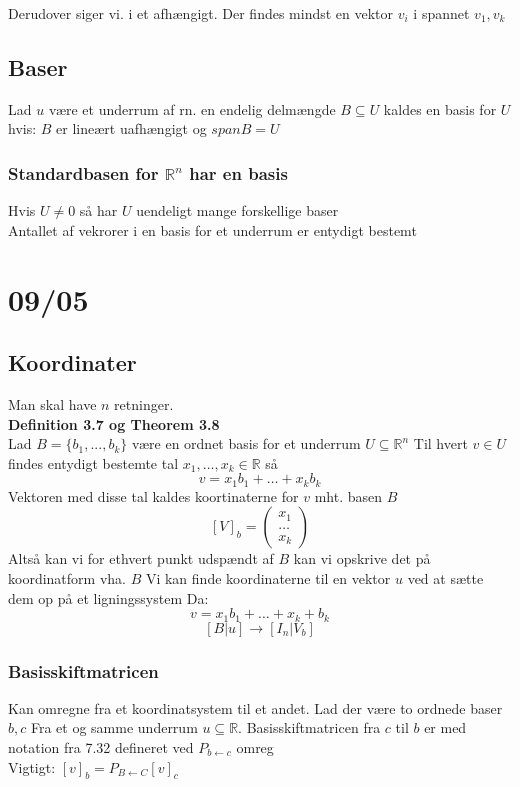\documentclass[a4paper,fleqn]{report}
\newcommand{\RR}{\mathbb{R}}
\begin{document}
	Derudover siger vi. i et afhængigt. Der findes mindst en vektor $v_i$ i spannet $v_1 , v_k$

	\section{Baser}
	Lad $u$ være et underrum af rn. en endelig delmængde $B \subseteq U$ kaldes en basis for
	$U$ hvis: $B$ er lineært uafhængigt og $span B = U$


	\subsection{Standardbasen for $\RR^n$ har en basis}
	Hvis $U \neq 0$ så har $U$ uendeligt mange forskellige baser\\

	Antallet af vekrorer i en basis for et underrum er entydigt bestemt

	\chapter{09/05}
	\section{Koordinater}
	Man skal have $n$ retninger.\\

	\textbf{Definition 3.7 og Theorem 3.8}\\
	Lad $B = \{b_1, ..., b_k\}$ være en ordnet basis for et underrum $U \subseteq \RR^n$
	Til hvert $v \in U$ findes entydigt bestemte tal $x_1, \dots, x_k \in \RR$ så\\
	\[v = x_1 b_1 + \dots + x_kb_k\] Vektoren med disse tal kaldes koortinaterne for $v$ mht.
	basen $B$ \[ [V]_b = \begin{pmatrix}x_1\\\dots\\x_k\end{pmatrix}\]
	Altså kan vi for ethvert punkt udspændt af $B$ kan vi opskrive det på koordinatform vha. $B$
	Vi kan finde koordinaterne til en vektor $u$ ved at sætte dem op på et ligningssystem Da:
	\[ v = x_1 b_1 + \dots + x_k+b_k \] \[ [B|u] \rightarrow [I_n|V_b]\] 

	\subsection{Basisskiftmatricen}
	Kan omregne fra et koordinatsystem til et andet. Lad der være to ordnede baser $b,c$
	Fra et og samme underrum $u \subseteq \RR$. Basisskiftmatricen fra $c$ til $b$ er med
	notation fra 7.32 defineret ved $P_{b \leftarrow c}$ omreg\\
	Vigtigt: $[v]_b = P_{B \leftarrow C}[v]_c$
\end{document}
